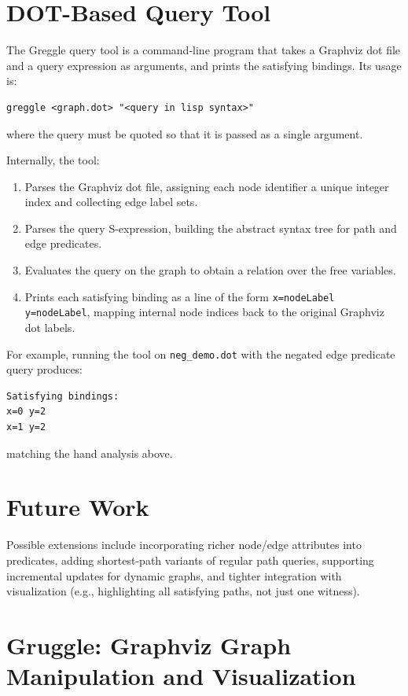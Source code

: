 \documentclass[11pt]{article}
\begin{document}
\section{DOT-Based Query Tool}

The Greggle query tool is a command-line program that takes a Graphviz dot file and a query expression as arguments, and prints the satisfying bindings. Its usage is:
\begin{verbatim}
greggle <graph.dot> "<query in lisp syntax>"
\end{verbatim}
where the query must be quoted so that it is passed as a single argument.

Internally, the tool:
\begin{enumerate}[leftmargin=*]
  \item Parses the Graphviz dot file, assigning each node identifier a unique integer index and collecting edge label sets.
  \item Parses the query S-expression, building the abstract syntax tree for path and edge predicates.
  \item Evaluates the query on the graph to obtain a relation over the free variables.
  \item Prints each satisfying binding as a line of the form \texttt{x=nodeLabel y=nodeLabel}, mapping internal node indices back to the original Graphviz dot labels.
\end{enumerate}

For example, running the tool on \texttt{neg\_demo.dot} with the negated edge predicate query produces:
\begin{verbatim}
Satisfying bindings:
x=0 y=2
x=1 y=2
\end{verbatim}
matching the hand analysis above.

\section{Future Work}

Possible extensions include incorporating richer node/edge attributes into predicates, adding shortest-path variants of regular path queries, supporting incremental updates for dynamic graphs, and tighter integration with visualization (e.g., highlighting all satisfying paths, not just one witness).

\section{Gruggle: Graphviz Graph Manipulation and Visualization}
\end{document}
